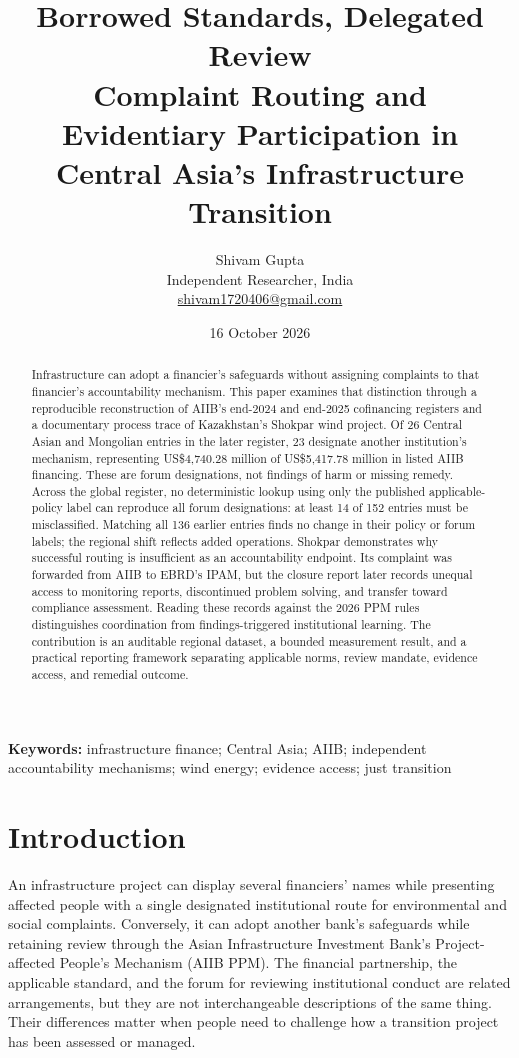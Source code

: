 \documentclass[11pt,a4paper]{article}
\title{\vspace{-1.4em}\textbf{Borrowed Standards, Delegated Review}\\[.45em]
\large Complaint Routing and Evidentiary Participation in\\Central Asia's Infrastructure Transition}
\author{Shivam Gupta\\\small Independent Researcher, India\\\small\href{mailto:shivam1720406@gmail.com}{shivam1720406@gmail.com}}
\date{16 October 2026}
\newcommand{\USD}{US\$}
\begin{document}
\maketitle
\begin{abstract}
\noindent Infrastructure can adopt a financier's safeguards without assigning complaints to that financier's accountability mechanism. This paper examines that distinction through a reproducible reconstruction of AIIB's end-2024 and end-2025 cofinancing registers and a documentary process trace of Kazakhstan's Shokpar wind project. Of 26 Central Asian and Mongolian entries in the later register, 23 designate another institution's mechanism, representing \USD4,740.28 million of \USD5,417.78 million in listed AIIB financing. These are forum designations, not findings of harm or missing remedy. Across the global register, no deterministic lookup using only the published applicable-policy label can reproduce all forum designations: at least 14 of 152 entries must be misclassified. Matching all 136 earlier entries finds no change in their policy or forum labels; the regional shift reflects added operations. Shokpar demonstrates why successful routing is insufficient as an accountability endpoint. Its complaint was forwarded from AIIB to EBRD's IPAM, but the closure report later records unequal access to monitoring reports, discontinued problem solving, and transfer toward compliance assessment. Reading these records against the 2026 PPM rules distinguishes coordination from findings-triggered institutional learning. The contribution is an auditable regional dataset, a bounded measurement result, and a practical reporting framework separating applicable norms, review mandate, evidence access, and remedial outcome.
\end{abstract}
\noindent\textbf{Keywords:} infrastructure finance; Central Asia; AIIB; independent accountability mechanisms; wind energy; evidence access; just transition

\section{Introduction}
An infrastructure project can display several financiers' names while presenting affected people with a single designated institutional route for environmental and social complaints. Conversely, it can adopt another bank's safeguards while retaining review through the Asian Infrastructure Investment Bank's Project-affected People's Mechanism (AIIB PPM). The financial partnership, the applicable standard, and the forum for reviewing institutional conduct are related arrangements, but they are not interchangeable descriptions of the same thing. Their differences matter when people need to challenge how a transition project has been assessed or managed.
\end{document}

